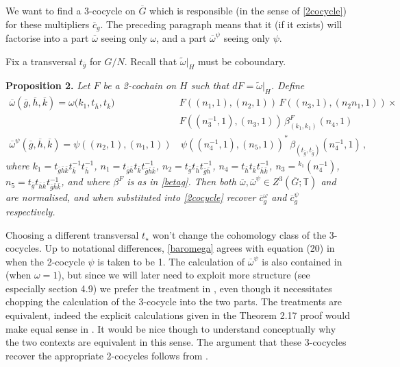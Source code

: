 \documentclass[12pt]{article}
\numberwithin{equation}{section}
\def\bbT           {\mathbb{T}}
\begin{document}
We want to find a 3-cocycle  on $\overline{G}$ which is responsible (in the
sense of \eqref{2cocycle}) 
for these multipliers $\overline{c}_g$. The preceding paragraph means that it (if it exists) will factorise into a part $\overline{\omega}$ seeing only $\omega$, and a part
$\overline{\omega}^\psi$ seeing only $\psi$. 

Fix a transversal $t_{\bar{g}}$ for $G/N$. Recall that  $\widetilde{\omega}|_H$ must be coboundary. 


\medskip\noindent\textbf{Proposition 2.} \cite{Dav3,Jon2} \textit{Let  $F$ be a  2-cochain on $H$ such that
$dF=\widetilde{\omega}|_H$.
 Define
\begin{align}\nonumber\overline{\omega}(\overline{g},\overline{h},\overline{k})=
\omega\bigl(k_1,t_{\bar{h}},t_{\bar{k}}\bigr)\,&
F((n_1,1),(n_{2},1))\,F((n_3,1),(n_2n_1,1))\times\\ \label{baromega} &F((n_3^{-1},1),(n_3,1)) \,\beta^F_{(k_1,k_1)}(n_4,1)\\
\overline{\omega}^\psi(\overline{g},\overline{h},\overline{k})=\psi((n_2,1),(n_1,1))&\,{\psi((n_4^{-1},1),(n_5,1))^*}\,\beta_{(t_{\bar{g}},t_{\bar{g}})}(n_4^{-1},1)\,,
\label{omegaJones} 
\end{align}
where ${k}_1=t_{\bar{g}\bar{h}\bar{k}}t^{-1}_{\bar{k}}t^{-1}_{\bar{h}}$, $n_{1}=t_{\bar{g}\bar{h}}t_{\bar{k}}t_{\bar{g}\bar{h}\bar{k}}^{-1}$, $n_{2}=t_{\bar{g}}t_{\bar{h}}t_{\bar{g}\bar{h}}^{-1}$, $n_4=t_{\bar{h}}t_{\bar{k}}t_{\bar{h}\bar{k}}^{-1}$, $n_{3}={}^{{k}_{1}}(n_4^{-1})$,  $n_5=t_{\bar{g}} t_{\bar{h}\bar{k}} t_{\bar{g}\bar{h}\bar{k}}^{-1}$, and where $\beta^F$ is as in \eqref{betag}. Then both $\overline{\omega},
\overline{\omega}^\psi\in Z^3(\overline{G};\bbT)$ and are normalised, and when substituted into \eqref{2cocycle} recover $\overline{c}_g^\omega$ and $\overline{c}_g^\psi$ respectively.}
\medskip

Choosing a different transversal $t_{\star}$ won't change the cohomology class of the 3-cocycles.
Up to notational differences, \eqref{baromega} agrees with equation (20) in \cite{Dav3} when the 2-cocycle $\psi$ is taken to be 1. The calculation of $\overline{\omega}^\psi$ is also contained in \cite{Dav3} (when $\omega=1$), but since we will later need to exploit more structure (see especially section 4.9)  we prefer the treatment in \cite{Jon2}, even though it necessitates chopping the calculation of the 3-cocycle into the two parts. 
The treatments are equivalent, indeed the explicit calculations given in the Theorem 2.17 proof would make equal sense in \cite{Jon2}. It would be nice though to understand conceptually why the two contexts are equivalent in this sense. The argument that these 3-cocycles recover the appropriate 2-cocycles
follows from \cite{Dav3}.
\end{document}
